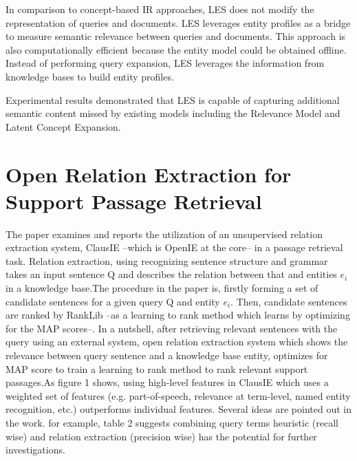 \documentclass[letterpaper,12pt]{article}
\begin{document}
In comparison to concept-based IR approaches, LES does not modify the representation of queries and documents. LES leverages entity profiles as a bridge to measure semantic relevance between queries and documents. This approach is also computationally efficient because the entity model could be obtained offline. Instead of performing query expansion, LES leverages the information from knowledge bases to build entity profiles.

Experimental results demonstrated that LES is capable of capturing additional semantic content missed by existing models including the Relevance Model and Latent Concept Expansion.

\section{Open Relation Extraction for Support Passage Retrieval}
The paper examines and reports the utilization of an unsupervised relation extraction system, ClausIE --which is OpenIE at the core-- in a passage retrieval task. Relation extraction, using recognizing sentence structure and grammar takes an input sentence Q and describes the relation between that and entities $e_i$ in a knowledge base.The procedure in the paper is, firstly forming a set of candidate sentences for a given query Q and entity $e_i$. Then, candidate sentences are ranked by RankLib --as a learning to rank method which learns by optimizing for the MAP scores--. In a nutshell, after retrieving relevant sentences with the query using an external system, open relation extraction system which shows the relevance between query sentence and a knowledge base entity, optimizes for MAP score to train a learning to rank method to rank relevant support passages.As figure 1 shows, using high-level features in ClausIE which uses a weighted set of features (e.g. part-of-speech, relevance at term-level, named entity recognition, etc.) outperforms individual features. Several ideas are pointed out in the work. for example, table 2 suggests combining query terms heuristic (recall wise) and relation extraction (precision wise) has the potential for further investigations. 
\end{document}
